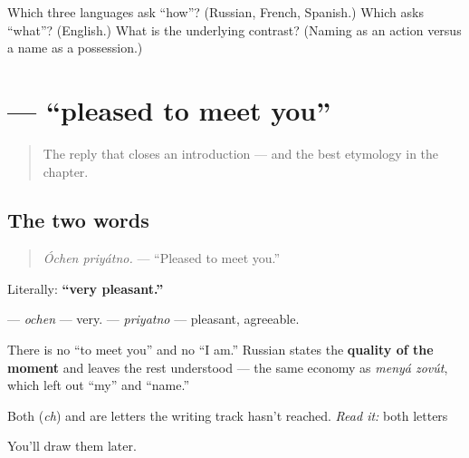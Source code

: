 \begin{tcolorbox}[breakable,colback=teal!4,colframe=teal!35!black,title={Before you move on}]
Which three languages ask \textquotedblleft{}how\textquotedblright{}? (Russian, French, Spanish.) Which asks \textquotedblleft{}what\textquotedblright{}? (English.) What is the underlying contrast? (Naming as an action versus a name as a possession.)
\end{tcolorbox}
\section[\texorpdfstring{\ru{очень} \ru{приятно} (óchen priyátno)}{очень приятно (óchen priyátno)}]{  — \textquotedblleft{}pleased to meet you\textquotedblright{}}

\label{lesson:RU-C02-ochen-priyatno}



\begin{quote}
The reply that closes an introduction — and the best etymology in the chapter.
\end{quote}

\subsection*{The two words}
\begin{quote}
\emph{Óchen priyátno.} — \textquotedblleft{}Pleased to meet you.\textquotedblright{}
\end{quote}

Literally: \textbf{\textquotedblleft{}very pleasant.\textquotedblright{}}

\textbf{} — \emph{ochen} — very. \textbf{} — \emph{priyatno} — pleasant, agreeable.

There is no \textquotedblleft{}to meet you\textquotedblright{} and no \textquotedblleft{}I am.\textquotedblright{} Russian states the \textbf{quality of the moment} and leaves the rest understood — the same economy as \emph{menyá zovút}, which left out \textquotedblleft{}my\textquotedblright{} and \textquotedblleft{}name.\textquotedblright{}

Both \textbf{} (\emph{ch}) and \textbf{} are letters the writing track hasn't reached. \emph{Read it:} both letters

You'll draw them later.

